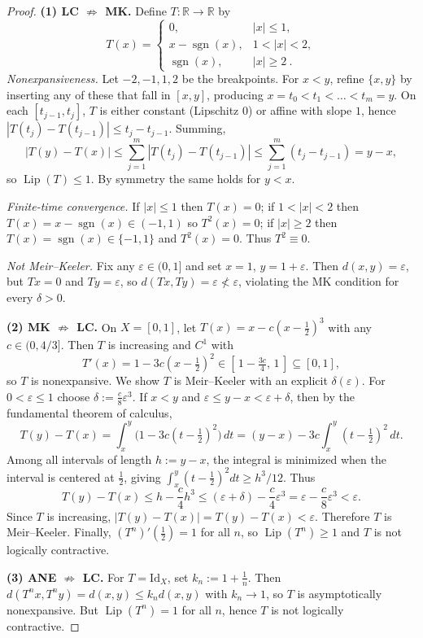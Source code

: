 \documentclass[11pt]{article}
\theoremstyle{definition}
\theoremstyle{remark}
\DeclareMathOperator{\Lip}{Lip}
\DeclareMathOperator{\sgn}{sgn}
\begin{document}
\begin{proof}
\textbf{(1) LC $\not\Rightarrow$ MK.} Define $T:\mathbb{R}\to\mathbb{R}$ by
\[
T(x)=
\begin{cases}
0, & |x|\le 1,\\[3pt]
x-\sgn(x), & 1<|x|<2,\\[3pt]
\sgn(x), & |x|\ge 2~.
\end{cases}
\]
\emph{Nonexpansiveness.} Let $-2,-1,1,2$ be the breakpoints. For $x<y$, refine $\{x,y\}$ by inserting any of these that fall in $[x,y]$, producing $x=t_0<t_1<\dots<t_m=y$. On each $[t_{j-1},t_j]$, $T$ is either constant (Lipschitz $0$) or affine with slope $1$, hence $|T(t_j)-T(t_{j-1})|\le t_j-t_{j-1}$. Summing,
\[
|T(y)-T(x)| \le \sum_{j=1}^m |T(t_j)-T(t_{j-1})|
\le \sum_{j=1}^m (t_j-t_{j-1}) = y-x,
\]
so $\Lip(T)\le 1$. By symmetry the same holds for $y<x$.

\emph{Finite-time convergence.} If $|x|\le 1$ then $T(x)=0$; if $1<|x|<2$ then $T(x)=x-\sgn(x)\in(-1,1)$ so $T^2(x)=0$; if $|x|\ge 2$ then $T(x)=\sgn(x)\in\{-1,1\}$ and $T^2(x)=0$. Thus $T^2\equiv 0$.

\emph{Not Meir--Keeler.} Fix any $\varepsilon\in(0,1]$ and set $x=1$, $y=1+\varepsilon$. Then $d(x,y)=\varepsilon$, but $Tx=0$ and $Ty=\varepsilon$, so $d(Tx,Ty)=\varepsilon\not<\varepsilon$, violating the MK condition for every $\delta>0$.

\smallskip
\textbf{(2) MK $\not\Rightarrow$ LC.} On $X=[0,1]$, let $T(x)=x-c\!\left(x-\tfrac12\right)^3$ with any $c\in (0,4/3]$. Then $T$ is increasing and $C^1$ with
\[
T'(x)=1-3c\!\left(x-\tfrac12\right)^2 \in [\,1- \tfrac{3c}{4},\,1\,]\subseteq[0,1],
\]
so $T$ is nonexpansive. We show $T$ is Meir--Keeler with an explicit $\delta(\varepsilon)$. For $0<\varepsilon\le 1$ choose $\delta:=\tfrac{c}{8}\varepsilon^3$. If $x<y$ and $\varepsilon\le y-x<\varepsilon+\delta$, then by the fundamental theorem of calculus,
\[
T(y)-T(x)=\int_x^y \Big(1-3c(t-\tfrac12)^2\Big)\,dt
= (y-x) - 3c\!\int_x^y (t-\tfrac12)^2\,dt.
\]
Among all intervals of length $h:=y-x$, the integral is minimized when the interval is centered at $\tfrac12$, giving $\int_x^y (t-\tfrac12)^2 dt \ge h^3/12$. Thus
\[
T(y)-T(x) \le h - \frac{c}{4}h^3 \le (\varepsilon+\delta)-\frac{c}{4}\varepsilon^3
= \varepsilon - \frac{c}{8}\varepsilon^3 < \varepsilon.
\]
Since $T$ is increasing, $|T(y)-T(x)|=T(y)-T(x)<\varepsilon$. Therefore $T$ is Meir--Keeler. Finally, $(T^n)'(\tfrac12)=1$ for all $n$, so $\Lip(T^n)\ge 1$ and $T$ is not logically contractive.

\smallskip
\textbf{(3) ANE $\not\Rightarrow$ LC.} For $T=\mathrm{Id}_X$, set $k_n:=1+\tfrac1n$. Then $d(T^n x,T^n y)=d(x,y)\le k_n d(x,y)$ with $k_n\to 1$, so $T$ is asymptotically nonexpansive. But $\Lip(T^n)=1$ for all $n$, hence $T$ is not logically contractive.
\end{proof}
\end{document}
